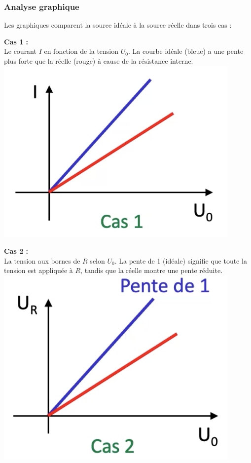 \subsubsection{Analyse graphique}
Les graphiques comparent la source idéale à la source réelle dans trois cas : \\
\vspace{5px}
\begin{minipage}[t]{0.3\textwidth}
\small
\textbf{Cas 1 :} \\
Le courant $I$ en fonction de la tension $U_0$. La courbe idéale (bleue) a une pente plus forte que la réelle (rouge) à cause de la résistance interne.
\vfill
\centering
\includegraphics[width=0.90\textwidth]{chapters/chapter1/images/cas1.png}
\end{minipage}
\hfill
\vline
\hfill
\begin{minipage}[t]{0.3\textwidth}    \small
\textbf{Cas 2 :} \\
La tension aux bornes de $R$ selon $U_0$. La pente de 1 (idéale) signifie que toute la tension est appliquée à $R$, tandis que la réelle montre une pente réduite.
\vfill
\centering
\includegraphics[width=0.90\textwidth]{chapters/chapter1/images/cas2.png}
\end{minipage}
